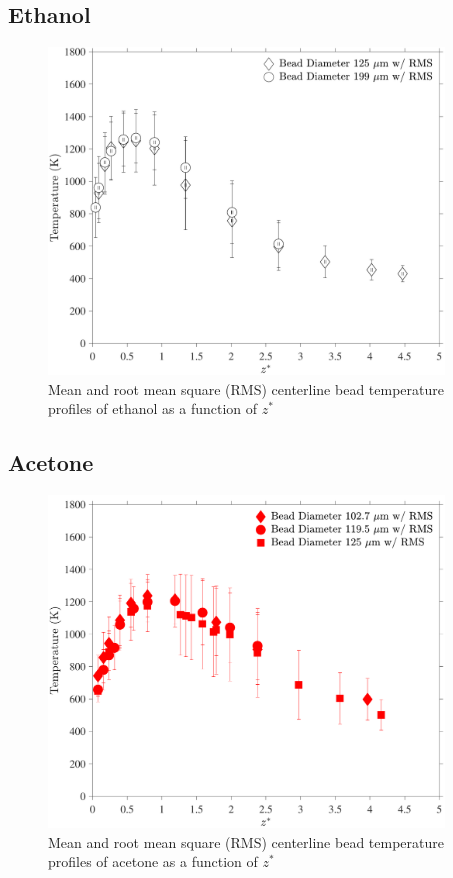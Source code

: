 \documentclass[12pt]{article}
\begin{document}
\subsection{Ethanol}
\label{ssec:Ethanol_Bead_Temp}
\begin{figure}[h!]
	\centering
\includegraphics[width=10.5cm,keepaspectratio]{Ethanol_Bead_Temperature.pdf}
	\caption[Mean and RMS centerline bead temperature profile of ethanol]{Mean and root mean square (RMS) centerline bead temperature profiles of ethanol as a function of $z^*$}
	\label{fig:Ethanol_Bead_Temp}
\end{figure}

\pagebreak

\subsection{Acetone}
\label{ssec:Acetone_Bead_Temp}
\begin{figure}[!h]
	\centering
\includegraphics[width=10.5cm,keepaspectratio]{Acetone_Bead_Temperature.pdf}
	\caption[Mean and RMS centerline bead temperature profile of acetonel]{Mean and root mean square (RMS) centerline bead temperature profiles of acetone as a function of $z^*$}
	\label{fig:Acetone_Bead_Temp}
\end{figure}
\end{document}
